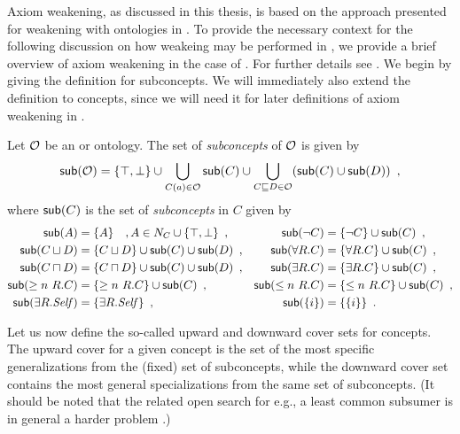 
Axiom weakening, as discussed in this thesis, is based on the approach presented for weakening with \ALC ontologies in \cite{troquard2018repairing}. To provide the necessary context for the following discussion on how weakeing may be performed in \SROIQ, we provide a brief overview of axiom weakening in the case of \ALC. For further details see \cite{troquard2018repairing}.
%
We begin by giving the definition for subconcepts. We will immediately also extend the definition to \SROIQ concepts, since we will need it for later definitions of axiom weakening in \SROIQ.

\begin{definition}
  Let $\mathcal{O}$ be an \ALC or \SROIQ ontology. The set of \emph{subconcepts} of $\mathcal{O}$ is given by
  \begin{align*}
    {\ensuremath{\mathsf{sub}}}(\mathcal{O}) = \{\top, \bot\} \cup \bigcup_{C(a) \in \mathcal{O}} {\mathsf{sub}}(C) \cup \bigcup_{C \sqsubseteq D \in \mathcal{O}} ( {\mathsf{sub}}(C) \cup {\ensuremath{\mathsf{sub}}}(D) ) \enspace,
  \end{align*}
  where ${\mathsf{sub}}(C)$ is the set of \emph{subconcepts} in $C$ given by
  \begin{align*}
    {\ensuremath{\mathsf{sub}}}(A) &= \{ A \} \quad , A \in N_C \cup \{ \top, \bot \} \enspace, &
    {\mathsf{sub}}(\lnot C) &= \{ \lnot C \} \cup {\ensuremath{\mathsf{sub}}}(C) \enspace, \\
    {\mathsf{sub}}(C \sqcup D) &= \{ C \sqcup D \} \cup {\ensuremath{\mathsf{sub}}}(C) \cup {\ensuremath{\mathsf{sub}}}(D) \enspace, &
    {\mathsf{sub}}(\forall R.C) &= \{ \forall R.C \} \cup {\ensuremath{\mathsf{sub}}}(C) \enspace, \\
    {\mathsf{sub}}(C \sqcap D) &= \{ C \sqcap D \} \cup {\ensuremath{\mathsf{sub}}}(C) \cup {\ensuremath{\mathsf{sub}}}(D) \enspace, &
    {\mathsf{sub}}(\exists R.C) &= \{ \exists R.C \} \cup {\ensuremath{\mathsf{sub}}}(C) \enspace, \\
    {\mathsf{sub}}(\geq n~R.C) &= \{ \geq n~R.C \} \cup {\ensuremath{\mathsf{sub}}}(C) \enspace, &
    {\mathsf{sub}}(\leq n~R.C) &= \{ \leq n~R.C \} \cup {\ensuremath{\mathsf{sub}}}(C) \enspace, \\
    {\mathsf{sub}}(\exists R.\mathit{Self}) &= \{ \exists R.\mathit{Self} \} \enspace, &
    {\mathsf{sub}}(\{i\}) &= \{ \{i\} \} \enspace.
  \end{align*}
\end{definition}

Let us now define the so-called upward and downward cover sets for concepts. The upward cover for a given concept is the set of the most specific generalizations from the (fixed) set of subconcepts, while the downward cover set contains the most general specializations from the same set of subconcepts. (It should be noted that the related open search for e.g., a least common subsumer is in general a harder problem \cite{baader2003least}.)

